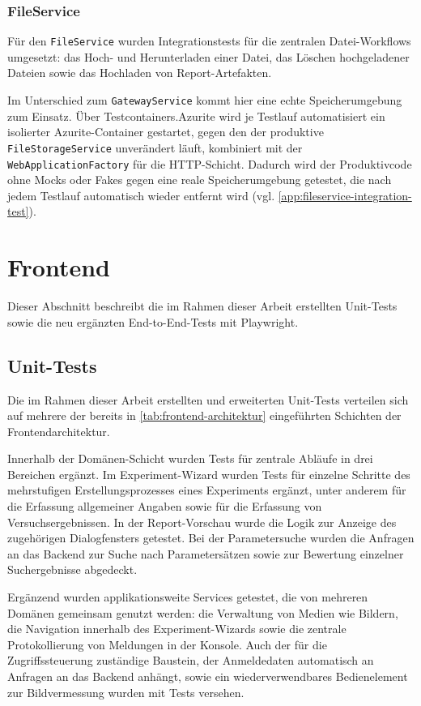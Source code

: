\subsubsection{FileService}
Für den \texttt{FileService} wurden Integrationstests für die zentralen Datei-Workflows umgesetzt: das Hoch- und Herunterladen einer Datei, das Löschen hochgeladener Dateien sowie das Hochladen von Report-Artefakten.

Im Unterschied zum \texttt{GatewayService} kommt hier eine echte Speicherumgebung zum Einsatz. Über Testcontainers.Azurite wird je Testlauf automatisiert ein isolierter Azurite-Container gestartet, gegen den der produktive \texttt{FileStorageService} unverändert läuft, kombiniert mit der \texttt{WebApplicationFactory} für die HTTP-Schicht. Dadurch wird der Produktivcode ohne Mocks oder Fakes gegen eine reale Speicherumgebung getestet, die nach jedem Testlauf automatisch wieder entfernt wird (vgl. \autoref{app:fileservice-integration-test}).

\section{Frontend}
Dieser Abschnitt beschreibt die im Rahmen dieser Arbeit erstellten Unit-Tests sowie die neu ergänzten End-to-End-Tests mit Playwright.


\subsection{Unit-Tests}
Die im Rahmen dieser Arbeit erstellten und erweiterten Unit-Tests verteilen sich auf mehrere der bereits in \autoref{tab:frontend-architektur} eingeführten Schichten der Frontendarchitektur.

Innerhalb der Domänen-Schicht wurden Tests für zentrale Abläufe in drei Bereichen ergänzt. Im Experiment-Wizard wurden Tests für einzelne Schritte des mehrstufigen Erstellungsprozesses eines Experiments ergänzt, unter anderem für die Erfassung allgemeiner Angaben sowie für die Erfassung von Versuchsergebnissen. In der Report-Vorschau wurde die Logik zur Anzeige des zugehörigen Dialogfensters getestet. Bei der Parametersuche wurden die Anfragen an das Backend zur Suche nach Parametersätzen sowie zur Bewertung einzelner Suchergebnisse abgedeckt.

Ergänzend wurden applikationsweite Services getestet, die von mehreren Domänen gemeinsam genutzt werden: die Verwaltung von Medien wie Bildern, die Navigation innerhalb des Experiment-Wizards sowie die zentrale Protokollierung von Meldungen in der Konsole. Auch der für die Zugriffssteuerung zuständige Baustein, der Anmeldedaten automatisch an Anfragen an das Backend anhängt, sowie ein wiederverwendbares Bedienelement zur Bildvermessung wurden mit Tests versehen.

